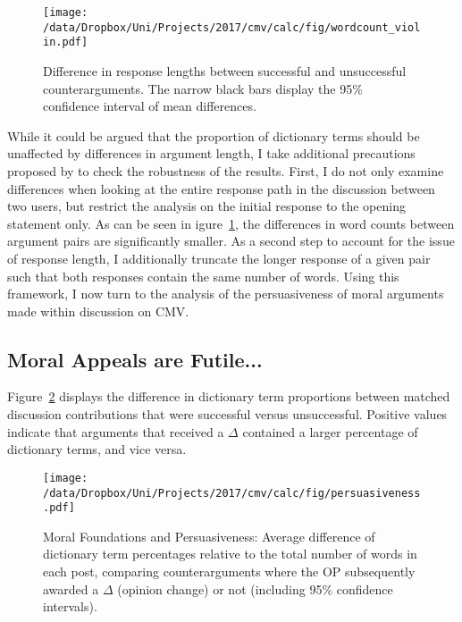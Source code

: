 \begin{figure}[ht]
\centering
\texttt{[image: /data/Dropbox/Uni/Projects/2017/cmv/calc/fig/wordcount\_violin.pdf]}
\caption[Difference in response lengths between successful and unsuccessful counterarguments]{Difference in response lengths between successful and unsuccessful counterarguments. The narrow black bars display the 95\% confidence interval of mean differences.}\label{fig:wordcount_violin}
\end{figure}

While it could be argued that the proportion of dictionary terms should be unaffected by differences in argument length, I take additional precautions proposed by \citet{tan2016winning} to check the robustness of the results. First, I do not only examine differences when looking at the entire response path in the discussion between two users, but restrict the analysis on the initial response to the opening statement only. As can be seen in igure~\ref{fig:wordcount_violin}, the differences in word counts between argument pairs are significantly smaller. As a second step to account for the issue of response length, I additionally truncate the longer response of a given pair such that both responses contain the same number of words. Using this framework, I now turn to the analysis of the persuasiveness of moral arguments made within discussion on CMV.


\subsection{Moral Appeals are Futile...}

Figure~\ref{fig:persuasiveness} displays the difference in dictionary term proportions between matched discussion contributions that were successful versus unsuccessful. Positive values indicate that arguments that received a $\Delta$ contained a larger percentage of dictionary terms, and vice versa.

\begin{figure}[ht]
\centering
\texttt{[image: /data/Dropbox/Uni/Projects/2017/cmv/calc/fig/persuasiveness.pdf]}
\caption[Moral Foundations and Persuasiveness]{Moral Foundations and Persuasiveness: Average difference of dictionary term percentages relative to the total number of words in each post, comparing counterarguments where the OP subsequently awarded a $\Delta$ (opinion change) or not (including 95\% confidence intervals).}\label{fig:persuasiveness}
\end{figure}

